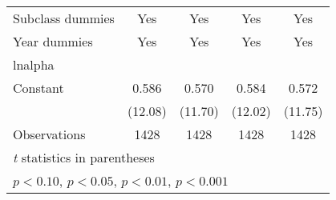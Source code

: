 \begin{table}[htbp]
{\begin{tabular}{l*{4}{c}}
\addlinespace
Subclass dummies&Yes&Yes&Yes&Yes\\
\addlinespace
Year dummies&Yes&Yes&Yes&Yes\\
\midrule
lnalpha             &                     &                     &                     &                     \\
Constant            &       0.586\sym{***}&       0.570\sym{***}&       0.584\sym{***}&       0.572\sym{***}\\
                    &     (12.08)         &     (11.70)         &     (12.02)         &     (11.75)         \\
\midrule
Observations        &        1428         &        1428         &        1428         &        1428         \\
\bottomrule
\multicolumn{5}{l}{\footnotesize \textit{t} statistics in parentheses}\\
\multicolumn{5}{l}{\footnotesize \sym{+} \(p<0.10\), \sym{*} \(p<0.05\), \sym{**} \(p<0.01\), \sym{***} \(p<0.001\)}\\
\end{tabular}
}
\end{table}
